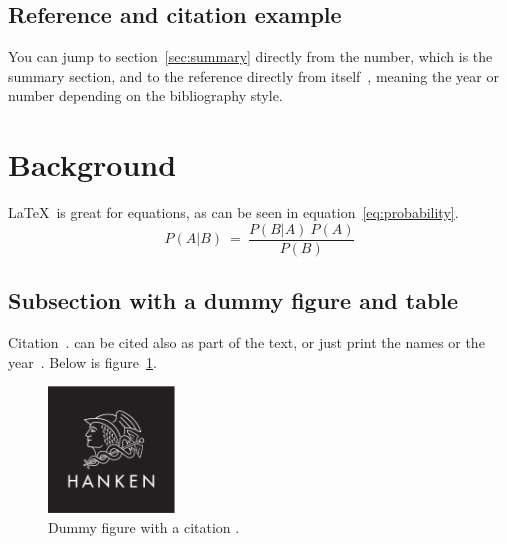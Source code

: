 \documentclass[12pt, a4paper, oneside]{article}
\begin{document}
\subsection{Reference and citation example} \label{subsec:reference-and-citation-example}

You can jump to section~\ref{sec:summary} directly from the number, which is the summary section,
and to the reference directly from itself~\citep{vet2007ophthal},
meaning the year or number depending on the bibliography style.

\clearpage


\section{Background} \label{sec:background}

\blindtext

\LaTeX~is great for equations, as can be seen in equation~\ref{eq:probability}.
\begin{equation} \label{eq:probability}
    P(A | B) \ = \ \frac{P(B | A) \ P(A)}{P(B)}
\end{equation}

\subsection{Subsection with a dummy figure and table} \label{subsec:subsection-with-a-dummy-figure-and-table}

Citation~\citep{hermanson2020anatomy, petersen2005advances}.
\citet{petersen2005advances} can be cited also as part of the text,
or just print the names \citeauthor{petersen2005advances} or the year~\citeyear{petersen2005advances}.
Below is figure~\ref{fig:figure}. \medskip

\begin{figure}[h]
    \centering
    \includegraphics[width=0.3\textwidth]{hanken_logo_platta}
    \caption[Dummy figure]{Dummy figure with a citation \citep{mellersh2014genetics}.}
    \label{fig:figure}
\end{figure}
\end{document}
